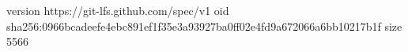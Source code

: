 version https://git-lfs.github.com/spec/v1
oid sha256:0966bcadeefe4ebc891ef1f35e3a93927ba0ff02e4fd9a672066a6bb10217b1f
size 5566
